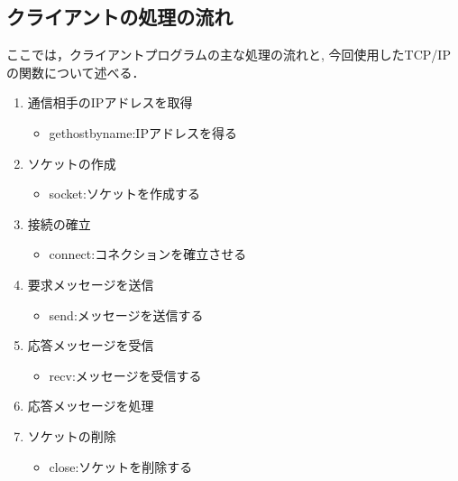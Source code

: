 \documentclass[a4j]{jarticle}
\begin{document}
      \subsection{クライアントの処理の流れ}
ここでは，クライアントプログラムの主な処理の流れと, 今回使用したTCP/IPの関数について述べる．
\begin{enumerate}
\item 通信相手のIPアドレスを取得
	\begin{itemize}
	\item gethostbyname:IPアドレスを得る
	\end{itemize}
\item ソケットの作成
	\begin{itemize}
	\item socket:ソケットを作成する
	\end{itemize}
\item 接続の確立
	\begin{itemize}
	\item connect:コネクションを確立させる
	\end{itemize}
\item 要求メッセージを送信
	\begin{itemize}
	\item send:メッセージを送信する
	\end{itemize}
\item 応答メッセージを受信
	\begin{itemize}
	\item recv:メッセージを受信する
	\end{itemize}
\item 応答メッセージを処理
\item ソケットの削除
	\begin{itemize}
	\item close:ソケットを削除する
	\end{itemize}
\end{enumerate}
\end{document}
